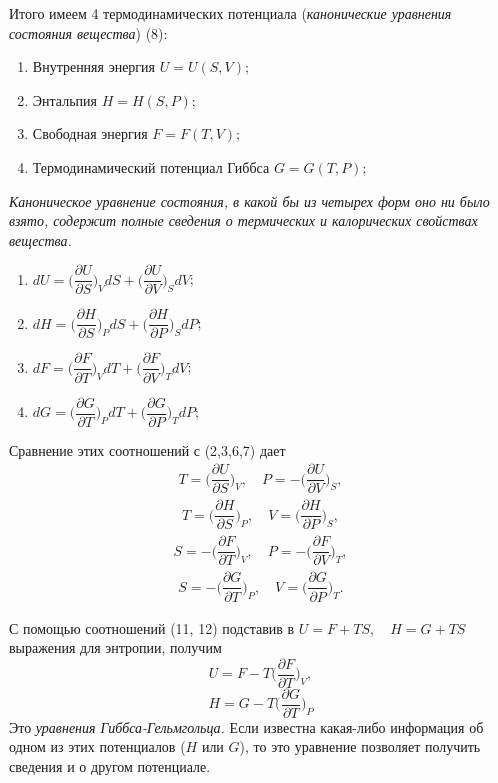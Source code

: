 \documentclass[14pt,a4paper]{scrartcl}
\begin{document}
	\quad Итого имеем 4 термодинамических потенциала (\textit{канонические уравнения состояния вещества}) (8):
	\begin{enumerate}
		\item Внутренняя энергия $ U = U(S,V); $
		\item Энтальпия $ H = H(S, P); $
		\item Свободная энергия  $ F = F(T,V); $
		\item Термодинамический потенциал Гиббса $ G = G(T, P); $
	\end{enumerate}
	\quad \textit{Каноническое уравнение состояния, в какой бы из четырех форм оно ни было взято, содержит полные сведения о термических и калорических свойствах вещества.}
		\begin{enumerate}
		\item $ dU =\biggl(\dfrac{\partial U}{\partial S}\biggr)_VdS +\biggl(\dfrac{\partial U}{\partial V}\biggr)_SdV$;
		\item $dH = \biggl(\dfrac{\partial H}{\partial S}\biggr)_PdS + \biggl(\dfrac{\partial H}{\partial P}\biggr)_SdP$;
		\item $dF = \biggl(\dfrac{\partial F}{\partial T}\biggr)_VdT + \biggl(\dfrac{\partial F}{\partial V}\biggr)_TdV$;
		\item $dG = \biggl(\dfrac{\partial G}{\partial T}\biggr)_PdT + \biggl(\dfrac{\partial G}{\partial P}\biggr)_TdP$;
	\end{enumerate}
	
	\quad Сравнение этих соотношений с (2,3,6,7) дает 
	\begin{align}
	T = \biggl(\dfrac{\partial U}{\partial S}\biggr)_V,\quad P = -\biggl(\dfrac{\partial U}{\partial V}\biggr)_S,\tag{9}
	\end{align}
	\begin{align}
	T = \biggl(\dfrac{\partial H}{\partial S}\biggr)_P,\quad V = \biggl(\dfrac{\partial H}{\partial P}\biggr)_S,\tag{10}
	\end{align}
	\begin{align}
	S = -\biggl(\dfrac{\partial F}{\partial T}\biggr)_V,\quad P = -\biggl(\dfrac{\partial F}{\partial V}\biggr)_T,\tag{11}
	\end{align}
	\begin{align}
	S = -\biggl(\dfrac{\partial G}{\partial T}\biggr)_P,\quad V = \biggl(\dfrac{\partial G}{\partial P}\biggr)_T.\tag{12}
	\end{align}

	\quad С помощью соотношений (11, 12) подставив в $U = F +TS, \quad H = G +TS$ выражения для энтропии, получим
	$$U = F - T\biggl(\dfrac{\partial F}{\partial T}\biggr)_V,$$
	$$H = G - T\biggl(\dfrac{\partial G}{\partial T}\biggr)_P$$
	Это \textit{уравнения Гиббса-Гельмгольца.} Если известна какая-либо информация об одном из этих потенциалов ($H$ или $G$), то это уравнение позволяет получить сведения и о другом потенциале. 
	
\end{document}
